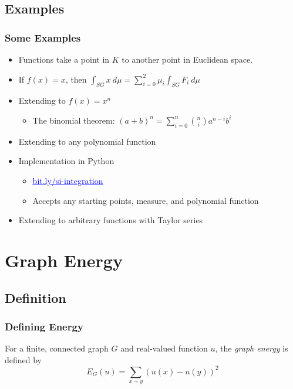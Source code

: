 \documentclass{beamer}
\begin{document}
\subsection{Examples}
\begin{frame}
	\frametitle{Some Examples}
	\begin{itemize}
		\item Functions take a point in $K$ to another point in Euclidean space.
		\item If $f(x) = x$, then $\displaystyle \int_{SG} x\ d \mu = \sum_{i = 0}^2 \mu_i \int_{SG} F_i\ d \mu$
		\item Extending to $f(x) = x^n$
			\begin{itemize}
				\item The binomial theorem: $\displaystyle (a + b)^n = \sum_{i = 0}^n \binom{n}{i} a^{n - i} b^i$
			\end{itemize}
		\item Extending to any polynomial function
		\item Implementation in Python
			\begin{itemize}
				\item \href{https://bit.ly/si-integration}{\textcolor{blue}{\underline{bit.ly/si-integration}}}
				\item Accepts any starting points, measure, and polynomial function
			\end{itemize}
		\item Extending to arbitrary functions with Taylor series
	\end{itemize}
\end{frame}

\section{Graph Energy}
\subsection{Definition}
\begin{frame}
	\frametitle{Defining Energy}
	\begin{definition}
		For a finite, connected graph $G$ and real-valued function $u$, the \textit{graph energy} is defined by
			\[
			E_G(u) = \sum_{x \sim y} (u(x) - u(y))^2
			\]
	\end{definition}
\end{frame}
\end{document}
